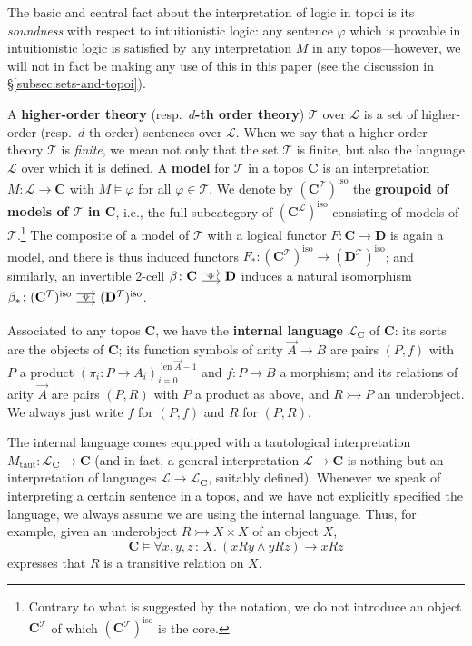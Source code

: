 \documentclass{amsart}
\newcommand\bC{\mathbf{C}}
\newcommand\bD{\mathbf{D}}
\newcommand\cL{\mathcal{L}}
\newcommand\cT{\mathcal{T}}
\newcommand\defword[1]{{\boldmath \textbf{#1}}}
\newcommand\iso{\mathrm{iso}}
\newcommand\len{\operatorname{len}}
\renewcommand\phi{\varphi}
\newcommand\tocell{\hspace{-5pt}\begin{tikzcd}[column sep=15pt, ampersand replacement=\&]{}\ar[r, shift left=3pt, ""{name=top}]\ar[r, shift right=3pt, ""'{name=bot}, start anchor=east, end anchor=west]\&{}\ar[Rightarrow, from=top, to=bot, shorten=0.5pt]\end{tikzcd}\hspace{-5pt}}
\newcommand\tolon{{\,:\,}}
\newcommand\tto{\rightarrowtail}
\newcommand\vA{\vek{A}}
\newcommand\vek[1]{{\vec{#1}}}
\theoremstyle{definition}
\theoremstyle{remark}
\theoremstyle{plainwithref}
\begin{document}
The basic and central fact about the interpretation of logic in topoi is its \emph{soundness} with respect to intuitionistic logic: any sentence \( \phi \) which is provable in intuitionistic logic is satisfied by any interpretation \( M \) in any topos---however, we will not in fact be making any use of this in this paper (see the discussion in \S\ref{subsec:sets-and-topoi}).

A \defword{higher-order theory} (resp.\ \defword{\( d \)-th order theory}) \( \cT \) over \( \cL \) is a set of higher-order (resp.\ \( d \)-th order) sentences over \( \cL \).
When we say that a higher-order theory \( \cT \) is \emph{finite}, we mean not only that the set \( \cT \) is finite, but also the language \( \cL \) over which it is defined.
A \defword{model} for \( \cT \) in a topos \( \bC \) is an interpretation \( M \colon \cL \to \bC \) with \( M \vDash \phi \) for all \( \phi \in \cT \).
We denote by \( (\bC^\cT)^\iso \) the \defword{groupoid of models of \( \cT \) in \( \bC \)}, i.e., the full subcategory of \( (\bC^{\cL})^\iso \) consisting of models of \( \cT \).\footnote{%
  \label{footnote:cotensor-atomic}%
  Contrary to what is suggested by the notation, we do not introduce an object \( \bC^\cT \) of which \( (\bC^\cT)^\iso \) is the core.
}
The composite of a model of \( \cT \) with a logical functor \( F \colon \bC \to \bD \) is again a model, and there is thus induced functors \( F_* \colon (\bC^\cT)^\iso \to (\bD^\cT)^\iso \); and similarly, an invertible 2-cell \( \beta \colon \bC \tocell \bD \) induces a natural isomorphism \( \beta_* \colon (\bC^\cT)^\iso \tocell (\bD^\cT)^\iso \).

Associated to any topos \( \bC \), we have the \defword{internal language} \( \cL_{\bC} \) of \( \bC \): its sorts are the objects of \( \bC \); its function symbols of arity \( \vA \to B \) are pairs \( (P,f) \) with \( P \) a product \( (\pi_i \colon P \to A_i)_{i=0}^{\len \vA - 1} \) and \( f \colon P \to B \) a morphism; and its relations of arity \( \vA \) are pairs \( (P,R) \) with \( P \) a product as above, and \( R \tto P \) an underobject.
We always just write \( f \) for \( (P,f) \) and \( R \) for \( (P,R) \).

The internal language comes equipped with a tautological interpretation \( M_{\mathrm{taut}} \colon \cL_{\bC} \to \bC \) (and in fact, a general interpretation \( \cL \to \bC \) is nothing but an interpretation of languages \( \cL \to \cL_{\bC} \), suitably defined).
Whenever we speak of interpreting a certain sentence in a topos, and we have not explicitly specified the language, we always assume we are using the internal language.
Thus, for example, given an underobject \( R \tto X \times X \) of an object \( X \),
\[
  \bC \vDash \forall x,y,z \tolon X.\ (x R y \wedge y R z) \to x R z
\]
expresses that \( R \) is a transitive relation on \( X \).
\end{document}
